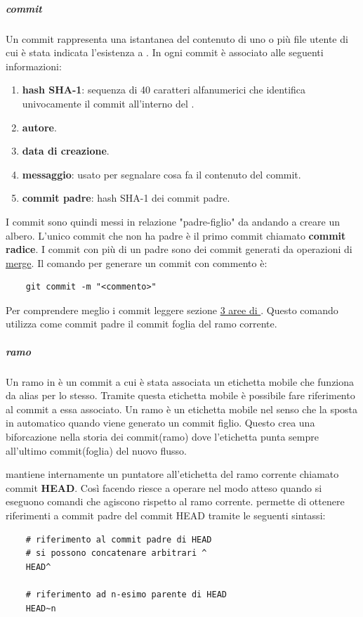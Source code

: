 \subparagraph{commit}
\label{subpar:commit}
Un commit rappresenta una istantanea del contenuto di uno o più file utente di cui è stata indicata l'esistenza a .
In  ogni commit è associato alle seguenti informazioni:
\begin{enumerate}
    \item \textbf{hash SHA-1}: sequenza di 40 caratteri alfanumerici che identifica univocamente il commit all'interno del .
    \item \textbf{autore}.
    \item \textbf{data di creazione}.
    \item \textbf{messaggio}: usato per segnalare cosa fa il contenuto del commit.
    \item \textbf{commit padre}: hash SHA-1 dei commit padre.
\end{enumerate}
I commit sono quindi messi in relazione "padre-figlio" da  andando a creare un albero.
L'unico commit che non ha padre è il primo commit chiamato \textbf{commit radice}.
I commit con più di un padre sono dei commit generati da operazioni di \hyperref[subpar:merge]{merge}.
Il comando  per generare un commit con commento è:
\begin{lstlisting}
    git commit -m "<commento>"
\end{lstlisting}
Per comprendere meglio i commit leggere sezione \hyperref[subpar:3_aree_git]{3 aree di }.
Questo comando utilizza come commit padre il commit foglia del ramo corrente. 

\subparagraph{ramo}
\label{subpar:branch}
Un ramo in  è un commit a cui è stata associata un etichetta mobile che funziona da alias per lo stesso.
Tramite questa etichetta mobile è possibile fare riferimento al commit a essa associato.
Un ramo è un etichetta mobile nel senso che  la sposta in automatico quando viene generato un commit figlio.
Questo crea una biforcazione nella storia dei commit(ramo) dove l'etichetta punta sempre all'ultimo commit(foglia) del nuovo flusso.

 mantiene internamente un puntatore all'etichetta del ramo corrente chiamato commit \textbf{HEAD}.
Così facendo riesce a operare nel modo atteso quando si eseguono comandi che agiscono rispetto al ramo corrente.
 permette di ottenere riferimenti a commit padre del commit HEAD tramite le seguenti sintassi:
\begin{lstlisting}
    # riferimento al commit padre di HEAD
    # si possono concatenare arbitrari ^
    HEAD^

    # riferimento ad n-esimo parente di HEAD
    HEAD~n
\end{lstlisting}
 


